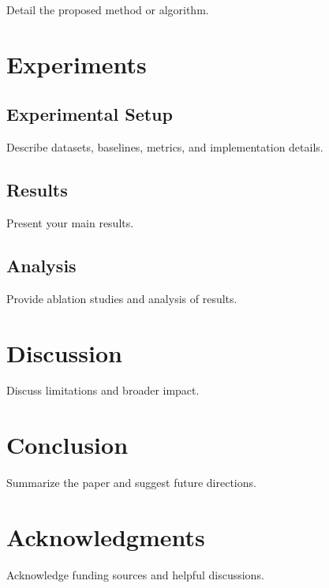 \documentclass[11pt]{article}
\begin{document}
Detail the proposed method or algorithm.

\section{Experiments}
\label{sec:experiments}

\subsection{Experimental Setup}

Describe datasets, baselines, metrics, and implementation details.

\subsection{Results}

Present your main results.


\subsection{Analysis}

Provide ablation studies and analysis of results.

\section{Discussion}
\label{sec:discussion}

Discuss limitations and broader impact.

\section{Conclusion}
\label{sec:conclusion}

Summarize the paper and suggest future directions.

\section*{Acknowledgments}

Acknowledge funding sources and helpful discussions.




\end{document}
